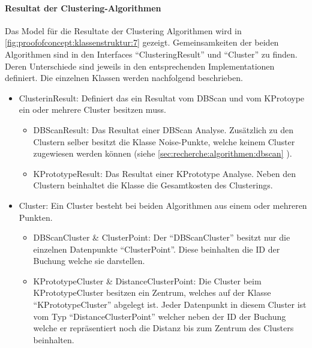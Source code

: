 \paragraph{Resultat der Clustering-Algorithmen} Das Model für die Resultate der Clustering Algorithmen wird in \cref{fig:proofofconcept:klassenstruktur:7} gezeigt. Gemeinsamkeiten der beiden Algorithmen sind in den Interfaces "`ClusteringResult"' und "`Cluster"' zu finden. Deren Unterschiede sind jeweils in den entsprechenden Implementationen definiert. Die einzelnen Klassen werden nachfolgend beschrieben.
\begin{itemize}
	\item ClusterinResult: Definiert das ein Resultat vom DBScan und vom KProtoype ein oder mehrere Cluster besitzen muss.
	\begin{itemize}  
		\item DBScanResult: Das Resultat einer DBScan Analyse. Zusätzlich zu den Clustern selber besitzt die Klasse Noise-Punkte, welche keinem Cluster zugewiesen werden können (siehe \cref{sec:recherche:algorithmen:dbscan} ).
		\item KPrototypeResult: Das Resultat einer KPrototype Analyse. Neben den Clustern beinhaltet die Klasse die Gesamtkosten des Clusterings.
	\end{itemize}  
	\item Cluster: Ein Cluster besteht bei beiden Algorithmen aus einem oder mehreren Punkten.
		\begin{itemize}  
			\item DBScanCluster \& ClusterPoint: Der "`DBScanCluster"' besitzt nur die einzelnen Datenpunkte "`ClusterPoint"'. Diese beinhalten die ID der Buchung welche sie darstellen.
			\item KPrototypeCluster \& DistanceClusterPoint: Die Cluster beim KPrototypeCluster besitzen ein Zentrum, welches auf der Klasse "`KPrototypeCluster"' abgelegt ist. Jeder Datenpunkt in diesem Cluster ist vom Typ "`DistanceClusterPoint"' welcher neben der ID der Buchung welche er repräsentiert noch die Distanz bis zum Zentrum des Clusters beinhalten.
		\end{itemize}  
\end{itemize}  




